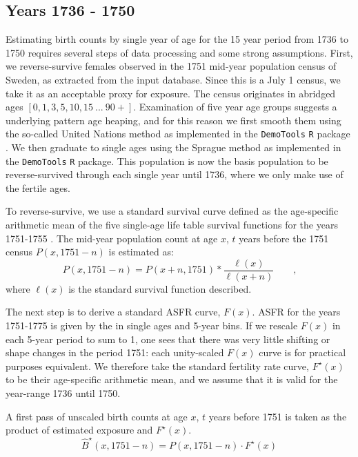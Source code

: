 \documentclass{article}
\newcommand{\tc}{\quad\quad\text{,}}
\begin{document}
\begin{appendix}
\subsection{Years 1736 - 1750}
\label{app:retroject}
Estimating birth counts by single year of age for the 15 year period from 1736 to 1750 requires several steps of data processing and some strong assumptions. First, we reverse-survive  females observed in the 1751 mid-year population census of Sweden, as extracted from the \citet{HMD} input database. Since this is a July 1 census, we take it as an acceptable proxy for exposure. The census originates in abridged ages $[0,1,3,5,10,15~...~90+]$. Examination of five year age groups suggests a underlying pattern age heaping, and for this reason we first smooth them using the so-called United Nations method \citep[see ][]{carrier1959reduction} as implemented in the \texttt{DemoTools} \texttt{R} package \citep{demotools}. We then graduate to single ages using the Sprague method \citep{sprague1880explanation,Shryock1973} as implemented in the \texttt{DemoTools} \texttt{R} package. This population is now the basis population to be reverse-survived through each single year until 1736, where we only make use of the fertile ages.

To reverse-survive, we use a standard survival curve defined as the age-specific arithmetic mean of the five single-age life table survival functions for the years 1751-1755 \citep{HMD}. The mid-year population count at age $x$, $t$ years before the 1751 census $P(x,1751-n)$ is estimated as:
\begin{equation}
\label{eq:Pxhat}
P(x,1751-n) = P(x+n,1751) * \frac{\ell(x)}{\ell(x+n)} \tc
\end{equation}
where $\ell(x)$ is the standard survival function described.

The next step is to derive a standard ASFR curve, $F(x)$. ASFR for the years 1751-1775 is given by the \citet{HFC} in single ages and 5-year bins. If we rescale $F(x)$ in each 5-year period to sum to 1, one sees that there was very little shifting or shape changes in the period 1751: each unity-scaled $F(x)$ curve is for practical purposes equivalent. We therefore take the standard fertility rate curve, $F^\star(x)$ to be their age-specific arithmetic mean, and we assume that it is valid for the year-range 1736 until 1750.

A first pass of unscaled birth counts at age $x$, $t$ years before 1751 is taken as the product of estimated exposure and $F^\star(x)$.
\begin{equation}
\widehat{B}^\star(x,1751-n) = P(x,1751-n) \cdot F^\star(x)
\end{equation}


\end{appendix}
\end{document}

